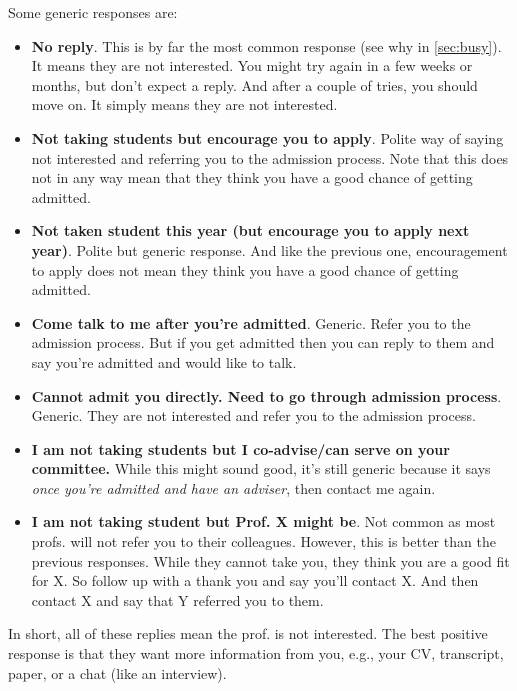 \documentclass[oneside,11pt,dvipsnames]{book}
\begin{document}
Some generic responses are:
\begin{itemize}
\item \textbf{No reply}. This is by far the most common response (see why in \autoref{sec:busy}).  It means they are not interested.
You might try again in a few weeks or months, but don't expect a reply. And after a couple of tries, you should move on.  It simply means they are not interested.
\item \textbf{Not taking students but encourage you to apply}. Polite way of saying not interested and referring you to the admission process. Note that this does not in any way mean that they think you have a good chance of getting admitted.

\item \textbf{Not taken student this year (but encourage you to apply next year)}. Polite but generic response.  And like the previous one, encouragement to apply does not mean they think you have a good chance of getting admitted.

\item \textbf{Come talk to me after you're admitted}. Generic. Refer you to the admission process. But if you get admitted then you can reply to them and say you're admitted and would like to talk.

\item \textbf{Cannot admit you directly. Need to go through admission process}. Generic. They are not interested and refer you to the admission process.

\item \textbf{I am not taking students but I co-advise/can serve on your committee.} While this might sound good, it's still generic because it says \emph{once you're admitted and have an adviser}, then contact me again. 

\item \textbf{I am not taking student but Prof. X might be}. Not common as most profs. will not refer you to their colleagues. However, this is better than the previous responses. While they cannot take you, they think you are a good fit for X. So follow up with a thank you and say you'll contact X.  And then contact X and say that Y referred you to them.
\end{itemize}

In short, all of these replies mean the prof. is not interested.  The best positive response is that they want more information from you, e.g., your CV, transcript, paper, or a chat (like an interview). 
\end{document}
